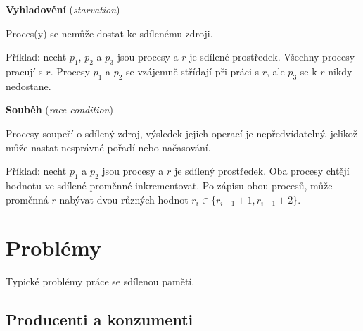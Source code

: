 \begin{compactitem}
    \item \textbf{Vyhladovění} (\textit{starvation}) \begin{compactitem}
        \item Proces(y) se nemůže dostat ke sdílenému zdroji.
        \item Příklad: nechť $p_1$, $p_2$ a $p_3$ jsou procesy a $r$ je sdílené prostředek. Všechny procesy pracují s $r$. Procesy $p_1$ a $p_2$ se vzájemně střídají při práci s $r$, ale $p_3$ se k $r$ nikdy nedostane.
    \end{compactitem}

    \item \textbf{Souběh} (\textit{race condition}) \begin{compactitem}
        \item Procesy soupeří o sdílený zdroj, výsledek jejich operací je nepředvídatelný, jelikož může nastat nesprávné pořadí nebo načasování.
        \item Příklad: nechť $p_1$ a $p_2$ jsou procesy a $r$ je sdílený prostředek. Oba procesy chtějí hodnotu ve sdílené proměnné inkrementovat. Po zápisu obou procesů, může proměnná $r$ nabývat dvou různých hodnot $r_i \in \{ r_{i-1} +1 , r_{i-1} +2 \}$.
    \end{compactitem}

\end{compactitem}


\section{Problémy}

\begin{compactitem}
    \item Typické problémy práce se sdílenou pamětí.
\end{compactitem}

\subsection{Producenti a konzumenti}

